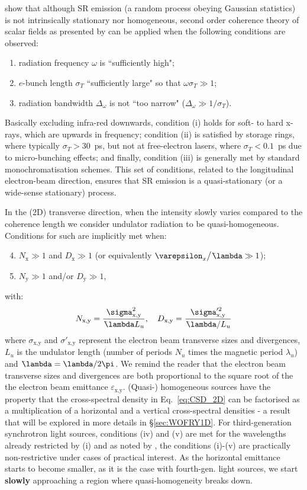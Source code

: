 \documentclass{iucr}              %
\newcommand{\inred}[1]{{\color{red}#1}}
\newcommand{\lambdabar}{{\mkern0.75mu\mathchar '26\mkern -8.2mu\lambda}}
\begin{document}
 show that although SR emission (a random process obeying Gaussian statistics) is not intrinsically stationary nor homogeneous, second order coherence theory of scalar fields as presented by  can be applied when the following conditions are observed:
\begin{enumerate}[label=(\roman*)]
\item radiation frequency $\omega$ is ``sufficiently high";
\item $e$-bunch length $\sigma_{T}$ ``sufficiently large" so that $\omega\sigma_{T}\gg1$;
\item radiation bandwidth $\Delta_\omega$ is not ``too narrow" ($\Delta_\omega\gg1\big/\sigma_{T}$).
\end{enumerate}
Basically excluding infra-red downwards, condition (i) holds for soft- to hard x-rays, which are upwards in frequency; condition (ii) is satisfied by storage rings, where typically $\sigma_{T}>30$~ps, but not at free-electron lasers, where $\sigma_{T}<0.1$~ps due to micro-bunching effects; and finally, condition (iii) is generally met by standard monochromatisation schemes. This set of conditions, related to the longitudinal electron-beam direction, ensures that SR emission is a quasi-stationary (or a wide-sense stationary) process. 

In the (2D) transverse direction, when the intensity slowly varies compared to the coherence length we consider undulator radiation to be quasi-homogeneous. Conditions for such are implicitly met when: 
\begin{enumerate}[label=(\roman*)]
\setcounter{enumi}{3}
\item $N_\text{x}\gg1$ and $D_\text{x}\gg1$ (or equivalently $\varepsilon_x\big/\lambdabar\gg1$);
\item $N_\text{y}\gg1$ and/or $D_\text{y}\gg1$,
\end{enumerate}
with:
\begin{equation}
    N_\text{x,y}=\frac{\sigma^2_\text{x,y}}{\lambdabar L_u}, \quad D_\text{x,y}=\frac{\sigma'^2_\text{x,y}}{\lambdabar/L_u}
\end{equation}
where $\sigma_\text{x,y}$ and $\sigma'_\text{x,y}$ represent the electron beam transverse sizes and divergences, $L_u$ is the undulator length (number of periods $N_u$ times the magnetic period $\lambda_u$) and $\lambdabar=\lambda/2\pi$. We remind the reader that the electron beam transverse sizes and divergences are both proportional to the square root of the the electron beam emittance $\varepsilon_\text{x,y}$. (Quasi-) homogeneous sources have the property that the cross-spectral density in Eq.~\ref{eq:CSD_2D} can be factorised as a multiplication of a horizontal and a vertical cross-spectral densities - a result that will be explored in more details in \S\ref{sec:WOFRY1D}. \inred{For third-generation synchrotron light sources,} conditions (iv) and (v) are met for the wavelengths already restricted by (i) and as noted by , the conditions (i)-(v) are practically non-restrictive under cases of practical interest. \inred{As the horizontal emittance starts to become smaller, as it is the case with fourth-gen. light sources, we start \textbf{slowly} approaching a region where quasi-homogeneity breaks down.}
\end{document}
